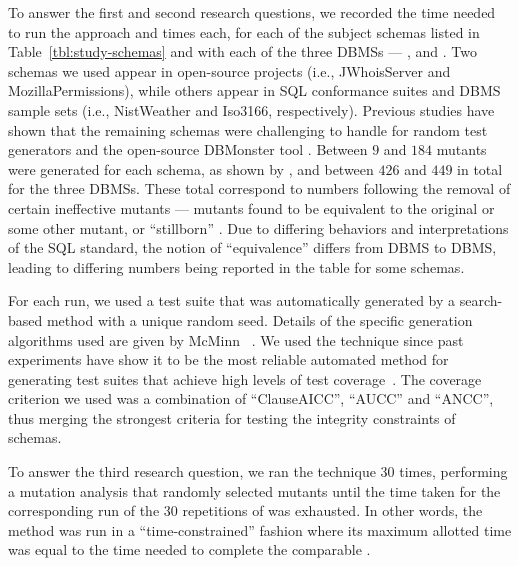 \begin{sloppypar}
 To answer the first and second research \mbox{questions}, we recorded the time needed to run the \Original approach and  times each, for each of the subject schemas listed in Table~\ref{tbl:study-schemas} and with each of the three DBMSs --- \HyperSQL, \Postgres and \SQLite.  Two schemas we used appear in open-source projects (i.e., JWhoisServer and MozillaPermissions), while others appear in SQL conformance suites and DBMS sample sets (i.e., NistWeather and Iso3166, respectively). Previous studies have shown that the remaining schemas were challenging to handle for random test generators \cite{McMinn2015} and the open-source DBMonster tool \cite{Kapfhammer2013}.  Between $9$ and $184$ mutants were generated for each schema, as shown by , and between $426$ and $449$ in total for the three DBMSs. These total correspond to numbers following the removal of certain ineffective mutants --- mutants found to be equivalent to the original or some other mutant, or ``stillborn'' \cite{Wright2014}. Due to differing behaviors and interpretations of the SQL standard, the notion of ``equivalence'' differs from DBMS to DBMS, leading to differing numbers being reported in the table for some schemas.
\end{sloppypar}




For each run, we used a test suite that was automatically generated by a search-based method with a unique random seed. Details of the specific generation algorithms used are given by McMinn \etal~\cite{McMinn2015}. We used the \AVM technique since past experiments have show it to be the most reliable automated method for generating test suites that achieve high levels of test coverage~\cite{McMinn2015}. The coverage criterion we used was a combination of ``ClauseAICC'', ``AUCC'' and ``ANCC'', thus merging the strongest criteria for testing the integrity constraints of schemas.


To answer the third research question, we ran the \Original technique $30$ times, performing a mutation analysis that randomly selected mutants until the time taken for the corresponding run of the $30$ repetitions of \vma was exhausted. In other words, the \Original method was run in a ``time-constrained'' fashion where its maximum allotted time was equal to the time needed to complete the comparable \vma.

